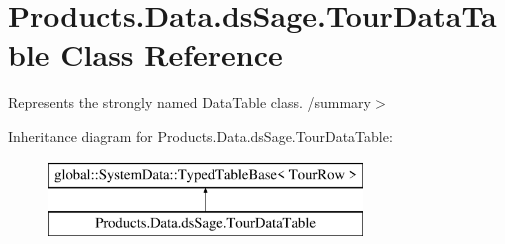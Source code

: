 \hypertarget{class_products_1_1_data_1_1ds_sage_1_1_tour_data_table}{}\section{Products.\+Data.\+ds\+Sage.\+Tour\+Data\+Table Class Reference}
\label{class_products_1_1_data_1_1ds_sage_1_1_tour_data_table}


Represents the strongly named Data\+Table class. /summary$>$  


Inheritance diagram for Products.\+Data.\+ds\+Sage.\+Tour\+Data\+Table\+:\begin{figure}[H]
\begin{center}
\leavevmode
\includegraphics[height=2.000000cm]{class_products_1_1_data_1_1ds_sage_1_1_tour_data_table}
\end{center}
\end{figure}
